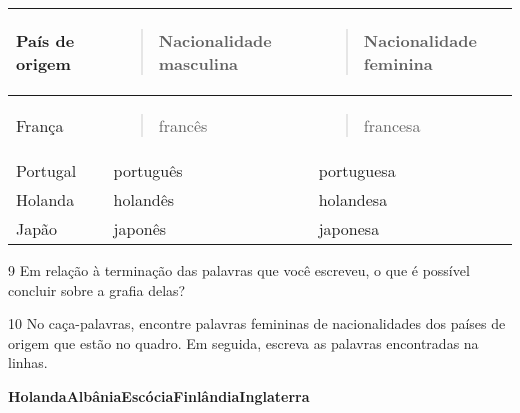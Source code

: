 \begin{longtable}[]{@{}lll@{}}
\toprule
\begin{minipage}[b]{0.32\columnwidth}\raggedright\strut
\textbf{País de origem}\strut
\end{minipage} & \begin{minipage}[b]{0.32\columnwidth}\raggedright\strut
\begin{quote}
\textbf{Nacionalidade masculina}
\end{quote}\strut
\end{minipage} & \begin{minipage}[b]{0.32\columnwidth}\raggedright\strut
\begin{quote}
\textbf{Nacionalidade feminina }
\end{quote}\strut
\end{minipage}\tabularnewline
\midrule
\endhead
\begin{minipage}[t]{0.32\columnwidth}\raggedright\strut
França\strut
\end{minipage} & \begin{minipage}[t]{0.32\columnwidth}\raggedright\strut
\begin{quote}
francês
\end{quote}\strut
\end{minipage} & \begin{minipage}[t]{0.32\columnwidth}\raggedright\strut
\begin{quote}
francesa
\end{quote}\strut
\end{minipage}\tabularnewline
Portugal & português & portuguesa\tabularnewline
Holanda & holandês & holandesa\tabularnewline
Japão & japonês & japonesa\tabularnewline
\bottomrule
\end{longtable}

\num{9} Em relação à terminação das palavras que você escreveu, o que é possível
concluir sobre a grafia delas?


\num{10} No caça-palavras, encontre palavras femininas de nacionalidades dos
países de origem que estão no quadro. Em seguida, escreva as palavras
encontradas na linhas.

\begin{mdframed}[linewidth=2pt,linecolor=salmao,roundcorner=20pt]
\textbf{Holanda}\hfill \textbf{Albânia}\hfill \textbf{Escócia}\hfill \textbf{Finlândia}\hfill \textbf{Inglaterra}
\end{mdframed}

